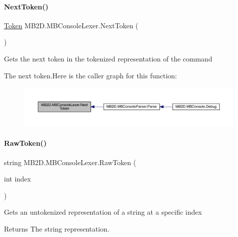 \paragraph{\texorpdfstring{Next\+Token()}{NextToken()}}
{\footnotesize\ttfamily \hyperlink{namespace_m_b2_d_ab170e7e7db86e5ccb0ae156c0d9a6002}{Token} M\+B2\+D.\+M\+B\+Console\+Lexer.\+Next\+Token (\begin{DoxyParamCaption}{ }\end{DoxyParamCaption})\hspace{0.3cm}{\ttfamily [inline]}}



Gets the next token in the tokenized representation of the command 

The next token.Here is the caller graph for this function\+:
\nopagebreak
\begin{figure}[H]
\begin{center}
\leavevmode
\includegraphics[width=350pt]{class_m_b2_d_1_1_m_b_console_lexer_ab083ced0d68a7f7278fbb462a9c60410_icgraph}
\end{center}
\end{figure}
\hypertarget{class_m_b2_d_1_1_m_b_console_lexer_a9f08e0a2739eb027f6b8c46abe67f647}{}\label{class_m_b2_d_1_1_m_b_console_lexer_a9f08e0a2739eb027f6b8c46abe67f647} 
\paragraph{\texorpdfstring{Raw\+Token()}{RawToken()}}
{\footnotesize\ttfamily string M\+B2\+D.\+M\+B\+Console\+Lexer.\+Raw\+Token (\begin{DoxyParamCaption}\item[{int}]{index }\end{DoxyParamCaption})\hspace{0.3cm}{\ttfamily [inline]}}



Gets an untokenized representation of a string at a specific index 

\begin{DoxyReturn}{Returns}
The string representation.
\end{DoxyReturn}

